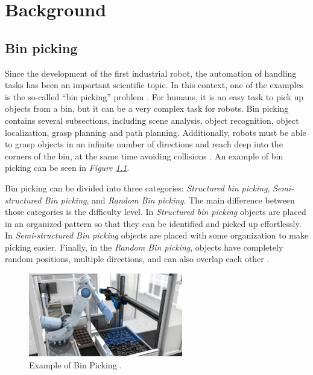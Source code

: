 \chapter{Background\label{cha:backround}}
\section{Bin picking}\label{sec:binpicking}
Since the development of the first industrial robot, the automation of handling tasks has been an important scientific topic. In this context, one of the examples is the so-called “bin picking” problem \cite{buchholz_bin-picking_2016}. 
For humans, it is an easy task to pick up objects from a bin, but it can be a very complex task for robots. 
Bin picking contains several subsections, including scene analysis, object recognition, object localization, grasp planning and path planning. 
Additionally, robots must be able to grasp objects in an infinite number of directions and reach deep into the corners of the bin, at the same time avoiding collisions \cite{truebenbach_is_2019}. An example of bin picking can be seen in \textit{Figure \ref{fig:binpickingimg}}.

Bin picking can be divided into three categories: \textit{Structured bin picking}, \textit{Semi-structured Bin picking}, and \textit{Random Bin picking}. The main difference between those categories is the difficulty level. In \textit{Structured bin picking} objects are placed in an organized pattern so that they can be identified and picked up effortlessly. In \textit{Semi-structured Bin picking} objects are placed with some organization to make picking easier. Finally, in the \textit{Random Bin picking}, objects have completely random positions, multiple directions, and can also overlap each other \cite{noauthor_future_nodate}. 

\begin{figure}[h]
 \centering
 \includegraphics[width=0.6\textwidth]{graphics/binpickingimg.png}
 \caption{Example of Bin Picking \cite{noauthor_automating_nodate}.}
 \label{fig:binpickingimg}
\end{figure}

